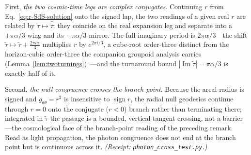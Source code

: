 \documentclass[11pt,a4paper]{article}
\theoremstyle{plain}
\theoremstyle{definition}
\theoremstyle{remark}
\begin{document}
First, \emph{the two cosmic-time legs are complex conjugates}. Continuing $r$ from Eq.~\eqref{eq:r-SdS-solution} onto the signed lap, the two readings of a given real $r$ are related by $\tilde\tau\mapsto\bar{\tilde\tau}$: they coincide on the real expansion leg and separate into a $+\pi\alpha/3$ wing and its $-\pi\alpha/3$ mirror. The full imaginary period is $2\pi\alpha/3$---the shift $\tilde\tau\mapsto\tilde\tau+\tfrac{2\pi i\alpha}{3}$ multiplies $r$ by $e^{2\pi i/3}$, a cube-root order-three distinct from the horizon-cubic order-three the companion groupoid analysis carries (Lemma~\ref{lem:twoturnings})~\cite{JanzenGroupoid}---and the turnaround bound $|\!\operatorname{Im}\tilde\tau|=\pi\alpha/3$ is exactly half of it.

Second, \emph{the null congruence crosses the branch point}. Because the areal radius is signed and $g_{\theta\theta}=r^2$ is insensitive to $\operatorname{sign}r$, the radial null geodesics continue through $r=0$ onto the conjugate ($r<0$) branch rather than terminating there; integrated in $\tilde\tau$ the passage is a bounded, vertical-tangent crossing, not a barrier---the cosmological face of the branch-point reading of the preceding remark. Read as light propagation, the photon congruence does not end at the branch point but is continuous across it. \emph{(Receipt: \texttt{photon\_cross\_test.py}.)}
\end{document}
